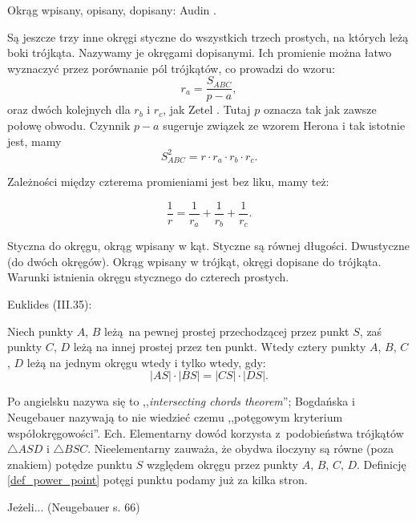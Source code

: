 
Okrąg wpisany, opisany, dopisany: Audin \cite[s. 98]{audin_2003}.
%
%
%

Są jeszcze trzy inne okręgi styczne do wszystkich trzech prostych, na których leżą boki trójkąta.
Nazywamy je okręgami dopisanymi.
%
Ich promienie można łatwo wyznaczyć przez porównanie pól trójkątów, co prowadzi do wzoru:
\begin{equation}
	r_a = \frac{S_{ABC}}{p - a},
\end{equation}
oraz dwóch kolejnych dla $r_b$ i $r_c$, jak Zetel \cite[s. 18]{zetel_2020}.
Tutaj $p$ oznacza tak jak zawsze połowę obwodu.
Czynnik $p - a$ sugeruje związek ze wzorem Herona i tak istotnie jest, mamy
\begin{equation}
	S_{ABC}^2 = r \cdot r_a \cdot r_b \cdot r_c.
\end{equation}

Zależności między czterema promieniami jest bez liku, mamy też:

\begin{equation}
	\frac{1}{r} = \frac {1} {r_a} + \frac {1} {r_b} + \frac {1} {r_c}.
\end{equation}

Styczna do okręgu, okrąg wpisany w kąt.
Styczne są równej długości.
Dwustyczne (do dwóch okręgów).
Okrąg wpisany w trójkąt, okręgi dopisane do trójkąta.
Warunki istnienia okręgu stycznego do czterech prostych.

Euklides (III.35):

\begin{proposition}
    \label{prop_intersecting_chords}
	Niech punkty $A$, $B$ leżą na pewnej prostej przechodzącej przez punkt $S$, zaś punkty $C$, $D$ leżą na innej prostej przez ten punkt.
	Wtedy cztery punkty $A$, $B$, $C$, $D$ leżą na jednym okręgu wtedy i tylko wtedy, gdy:
	\begin{equation}
		|AS| \cdot |BS| = |CS| \cdot |DS|.
	\end{equation}
\end{proposition}

Po angielsku nazywa się to ,,\emph{intersecting chords theorem}''; Bogdańska i Neugebauer nazywają to nie wiedzieć czemu ,,potęgowym kryterium współokręgowości''.
Ech.
Elementarny dowód korzysta z~podobieństwa trójkątów $\triangle ASD$ i $\triangle BSC$.
Nieelementarny zauważa, że obydwa iloczyny są równe (poza znakiem) potędze punktu $S$ względem okręgu przez punkty $A$, $B$, $C$, $D$.
Definicję \ref{def_power_point} potęgi punktu podamy już za kilka stron.
%

\begin{proposition}
	Jeżeli... (Neugebauer s. 66)
\end{proposition}

